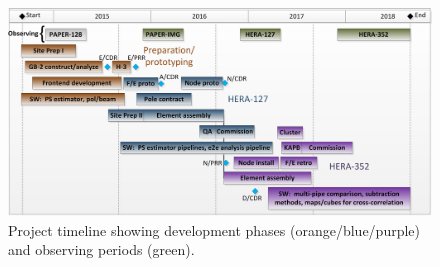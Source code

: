 \documentclass[preprint]{aastex}
\newcommand{\Caption}[4]{\vspace{#1}\renewcommand{\baselinestretch}{#2}\caption{#4}\vspace{#3}}
\begin{document}

\begin{figure}[t]\centering
\includegraphics[width=5.5in]{otherdocs/schedule.png}
\Caption{-0.1in}{0.9}{-0.1in}{\small Project timeline showing development phases (orange/blue/purple) and observing periods (green).}
\label{fig:timeline}
\end{figure}
\end{document}
